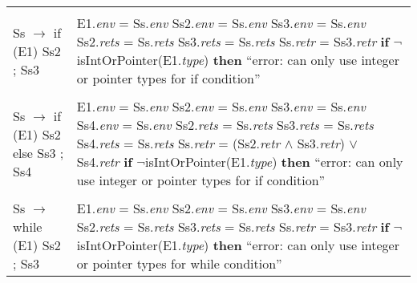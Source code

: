 \documentclass{article}
\begin{document}
\begin{center}
\begin{longtable}{ |l|l| }
     & \\
     
    Ss $\rightarrow$ if (E1) Ss2 ; Ss3 & \makecell[l]{E1.\textit{env} = Ss.\textit{env} \\ Ss2.\textit{env} = Ss.\textit{env} \\ Ss3.\textit{env} = Ss.\textit{env} \\ Ss2.\textit{rets} = Ss.\textit{rets} \\ Ss3.\textit{rets} = Ss.\textit{rets} \\ Ss.\textit{retr} = Ss3.\textit{retr} \\ \textbf{if} $\neg$isIntOrPointer(E1.\textit{type}) \\ \textbf{then} ``error: can only use integer or pointer types for if \\ condition''} \\
    
     & \\
     
    Ss $\rightarrow$ if (E1) Ss2 else Ss3 ; Ss4 & \makecell[l]{E1.\textit{env} = Ss.\textit{env} \\ Ss2.\textit{env} = Ss.\textit{env} \\ Ss3.\textit{env} = Ss.\textit{env} \\ Ss4.\textit{env} = Ss.\textit{env} \\ Ss2.\textit{rets} = Ss.\textit{rets} \\ Ss3.\textit{rets} = Ss.\textit{rets} \\ Ss4.\textit{rets} = Ss.\textit{rets} \\ Ss.\textit{retr} = (Ss2.\textit{retr} $\land$ Ss3.\textit{retr}) $\lor$ Ss4.\textit{retr} \\ \textbf{if} $\neg$isIntOrPointer(E1.\textit{type}) \\ \textbf{then} ``error: can only use integer or pointer types for if \\ condition''} \\
    
     & \\
     
    Ss $\rightarrow$ while (E1) Ss2 ; Ss3 & \makecell[l]{E1.\textit{env} = Ss.\textit{env} \\ Ss2.\textit{env} = Ss.\textit{env} \\ Ss3.\textit{env} = Ss.\textit{env} \\ Ss2.\textit{rets} = Ss.\textit{rets} \\ Ss3.\textit{rets} = Ss.\textit{rets} \\ Ss.\textit{retr} = Ss3.\textit{retr} \\ \textbf{if} $\neg$isIntOrPointer(E1.\textit{type}) \\ \textbf{then} ``error: can only use integer or pointer types for \\ while condition''} \\
    

\end{longtable}
\end{center}
\end{document}
